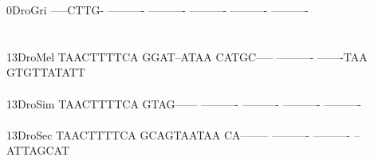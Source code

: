\documentclass[11pt,twoside,reqno,a4paper]{article}
\begin{document}
{0\hspace*{3\charwidth}DroGri	-----CTTG-	----------	----------	----------	----------	----------	\\
\hspace*{4\charwidth}\hspace*{7\charwidth}\hspace*{1\charwidth}\hspace*{1\charwidth}\hspace*{1\charwidth}\hspace*{1\charwidth}\hspace*{1\charwidth}\hspace*{1\charwidth}\\
\\
13\hspace*{2\charwidth}DroMel	TAACTTTTCA	GGAT--ATAA	CATGC-----	----------	-------TAA	GTGTTATATT	\\
\hspace*{4\charwidth}\hspace*{7\charwidth}\hspace*{1\charwidth}\hspace*{1\charwidth}\hspace*{1\charwidth}\hspace*{1\charwidth}\hspace*{1\charwidth}\hspace*{1\charwidth}\\
13\hspace*{2\charwidth}DroSim	TAACTTTTCA	GTAG------	----------	----------	----------	----------	\\
\hspace*{4\charwidth}\hspace*{7\charwidth}\hspace*{1\charwidth}\hspace*{1\charwidth}\hspace*{1\charwidth}\hspace*{1\charwidth}\hspace*{1\charwidth}\hspace*{1\charwidth}\\
13\hspace*{2\charwidth}DroSec	TAACTTTTCA	GCAGTAATAA	CA--------	----------	----------	--ATTAGCAT	\\
\hspace*{4\charwidth}\hspace*{7\charwidth}\hspace*{1\charwidth}\hspace*{1\charwidth}\hspace*{1\charwidth}\hspace*{1\charwidth}\hspace*{1\charwidth}\hspace*{1\charwidth}\\
}
\end{document}
